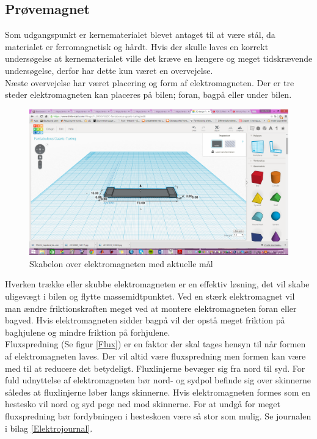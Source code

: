 \subsection{Prøvemagnet}
Som udgangspunkt er kernematerialet blevet antaget til at være stål, da materialet er ferromagnetisk og hårdt. Hvis der skulle laves en korrekt undersøgelse at kernematerialet ville det kræve en længere og meget tidskrævende undersøgelse, derfor har dette kun været en overvejelse. \\
Næste overvejelse har været placering og form af elektromagneten. Der er tre steder elektromagneten kan placeres på bilen; foran, bagpå eller under bilen.\\
\begin{figure}[h!]
\center
\includegraphics[scale=0.4]{./Graphics/Elektromagnet_2D}
\caption{Skabelon over elektromagneten med aktuelle mål}
\label{Elektromagnet_skabelon}
\end{figure}

Hverken trække eller skubbe elektromagneten er en effektiv løsning, det vil skabe uligevægt i bilen og flytte massemidtpunktet. Ved en stærk elektromagnet vil man ændre friktionskraften meget ved at montere elektromagneten foran eller bagved. Hvis elektromagneten sidder bagpå vil der opstå meget friktion på baghjulene og mindre friktion på forhjulene.\\
Fluxspredning (Se figur \ref{Flux}) er en faktor der skal tages hensyn til når formen af elektromagneten laves. Der vil altid være fluxspredning men formen kan være med til at reducere det betydeligt. Fluxlinjerne bevæger sig fra nord til syd. For fuld udnyttelse af elektromagneten bør nord- og sydpol befinde sig over skinnerne således at fluxlinjerne løber langs skinnerne. Hvis elektromagneten formes som en hestesko vil nord og syd pege ned mod skinnerne. For at undgå for meget fluxspredning bør fordybningen i hesteskoen være så stor som mulig. Se journalen i bilag \ref{Elektrojournal}.\\

